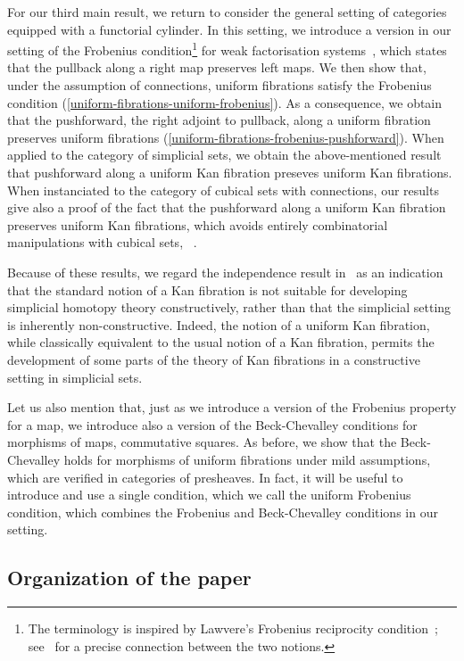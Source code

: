 \documentclass[reqno,10pt,a4paper,oneside,draft]{amsart}
\begin{document}
For our third main result, we return to consider the general setting of categories equipped with a functorial cylinder.
In this setting, we introduce a version in our setting of the Frobenius condition\footnote{The terminology is inspired by Lawvere's Frobenius reciprocity condition~\cite{lawvere-equality}; see~\cite{clementino:frobenius} for a precise connection between the two notions.} for weak factorisation systems~\cite{garner:types-omega-groupoids}, which states that the pullback along a right map preserves left maps.
We then show that, under the assumption of connections, uniform fibrations satisfy the Frobenius condition (\cref{uniform-fibrations-uniform-frobenius}).
As a consequence, we obtain that the pushforward, \ie the right adjoint to pullback, along a uniform fibration preserves uniform fibrations (\cref{uniform-fibrations-frobenius-pushforward}).
When applied to the category of simplicial sets, we obtain the above-mentioned result that pushforward along a uniform Kan fibration preseves uniform Kan fibrations.
When instanciated to the category of cubical sets with connections, our results give also a proof of the fact that the pushforward along a uniform 
Kan fibration preserves uniform Kan fibrations, which avoids entirely combinatorial manipulations with cubical sets, 
\cf~\cite{coquand-face,coquand-variation,huber-thesis}.


Because of these results, we regard the independence result in~\cite{coquand-non-constructivity-kan} as an indication that the standard notion of a Kan fibration is not suitable for developing simplicial homotopy theory constructively, rather than that the simplicial setting
is  inherently non-constructive. Indeed, the notion of a uniform Kan fibration, while classically equivalent to the usual notion of a Kan fibration, permits the development of some parts of the theory of Kan fibrations in a constructive setting in simplicial sets.

Let us also mention that, just as we introduce a version of the Frobenius property for a map, we introduce also a version of the Beck-Chevalley conditions for morphisms of maps, \ie commutative squares.
As before, we show that the Beck-Chevalley holds for morphisms of uniform fibrations under mild assumptions, which are verified in categories of presheaves. In fact, it will be useful to introduce and use a single condition, which we call the uniform Frobenius 
condition, which combines the Frobenius and Beck-Chevalley conditions in our setting. 

\subsection*{Organization of the paper}
\end{document}
